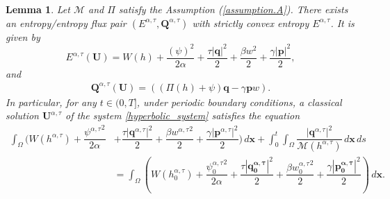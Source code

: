 \documentclass[11pt]{article}
\numberwithin{equation}{section}
\newtheorem{counter example}[theorem]{Counter Example}
\newtheorem{Lemma}[thm]{Lemma}
\numberwithin{equation}{section}
\numberwithin{equation}{section}
\newcommand{\rel}{^{\alpha, \tau}}
\begin{document}
\begin{Lemma}\label{entropy_lemma}
Let $\mathcal{M}$ and $\Pi$ satisfy the Assumption (\ref{assumption.A}). There exists an entropy/entropy flux pair $({E}^{\alpha, \tau}, \mathbf{Q}^{\alpha, \tau})$ with strictly convex entropy ${E}^{\alpha, \tau}$. It is given by
\begin{equation}\label{convex-entropy}
    E^{\alpha, \tau}(\mathbf{U}) =W(h)+\dfrac{({\psi})^2}{2\alpha}+\dfrac{\tau {|\mathbf{q}|}^2}{2}+\dfrac{\beta {w}^2}{2}+\dfrac{\gamma {|\mathbf{p}|}^2}{2}, 
\end{equation}
and
\begin{align}\label{entropy_flux}
    \mathbf{Q}^{\alpha, \tau}(\mathbf{U})= ((\Pi(h)+\psi)\mathbf{q}-\gamma \mathbf{p}w).
\end{align} 
In particular, for any $t\in (0, T]$, under periodic boundary conditions, a classical solution $\mathbf{U}\rel$ of the system \eqref{hyperbolic_system} satisfies the equation
\begin{equation}\label{energy_inequality}
\begin{aligned}
\int_{\Omega}\bigg(W(h\rel)+\dfrac{{\psi\rel}^2}{2\alpha}&+\dfrac{\tau {|\mathbf{q}\rel|}^2}{2}+\dfrac{\beta {w\rel}^2}{2}+\dfrac{\gamma {|\mathbf{p}\rel|}^2}{2}\bigg)\, d\mathbf{x}+\int_{0}^t \int_{\Omega} \dfrac{{|\mathbf{q}\rel|}^2}{\mathcal{M}(h\rel)}\, d\mathbf{x}\, ds\\
&=\int_{\Omega}\left(W(h\rel_0)+\dfrac{{\psi\rel_0}^2}{2\alpha}+\dfrac{\tau {{|\mathbf{q\rel_0}|}}^2}{2}+\dfrac{\beta {w\rel_0}^2}{2}+\dfrac{\gamma {|\mathbf{p\rel_0}|}^2}{2}\right)\, d\mathbf{x}.
\end{aligned}
\end{equation}
\end{Lemma}
\end{document}
